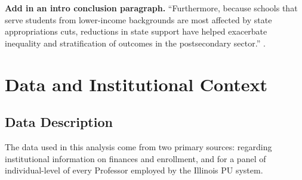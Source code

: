 \documentclass[notitlepage,12pt]{article}
\begin{document}
\textbf{Add in an intro conclusion paragraph.}
``Furthermore, because schools that serve students from lower-income backgrounds are most affected by state appropriations cuts, reductions in state support have helped exacerbate inequality and stratification of outcomes in the postsecondary sector.'' \citep{NBERw27885}.


%        
%        
%        


\section{Data and Institutional Context}
\label{sec:data}

\subsection{Data Description}
The data used in this analysis come from two primary sources: \citet[IPEDS]{ipeds} regarding institutional information on finances and enrollment, and \citet[IBHED]{ibhed} for a panel of individual-level of every Professor employed by the Illinois PU system.
\end{document}
